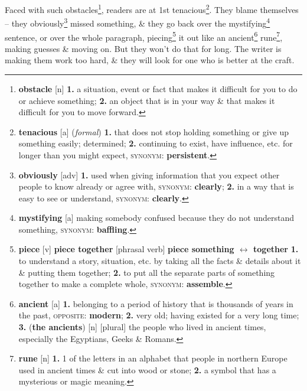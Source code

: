 \documentclass[oneside]{book}
\numberwithin{equation}{section}
\begin{document}
Faced with such obstacles\footnote{\textbf{obstacle} [n] \textbf{1.} a situation, event or fact that makes it difficult for you to do or achieve something; \textbf{2.} an object that is in your way \& that makes it difficult for you to move forward.}, readers are at 1st tenacious\footnote{\textbf{tenacious} [a] (\textit{formal}) \textbf{1.} that does not stop holding something or give up something easily; determined; \textbf{2.} continuing to exist, have influence, etc. for longer than you might expect, \textsc{synonym}: \textbf{persistent}.}. They blame themselves -- they obviously\footnote{\textbf{obviously} [adv] \textbf{1.} used when giving information that you expect other people to know already or agree with, \textsc{synonym}: \textbf{clearly}; \textbf{2.} in a way that is easy to see or understand, \textsc{synonym}: \textbf{clearly}.} missed something, \& they go back over the mystifying\footnote{\textbf{mystifying} [a] making somebody confused because they do not understand something, \textsc{synonym}: \textbf{baffling}.} sentence, or over the whole paragraph, piecing\footnote{\textbf{piece} [v] \textbf{piece together} [phrasal verb] \textbf{piece something $\leftrightarrow$ together} \textbf{1.} to understand a story, situation, etc. by taking all the facts \& details about it \& putting them together; \textbf{2.} to put all the separate parts of something together to make a complete whole, \textsc{synonym}: \textbf{assemble}.} it out like an ancient\footnote{\textbf{ancient} [a] \textbf{1.} belonging to a period of history that is thousands of years in the past, \textsc{opposite}: \textbf{modern}; \textbf{2.} very old; having existed for a very long time; \textbf{3.} (\textbf{the ancients}) [n] [plural] the people who lived in ancient times, especially the Egyptians, Geeks \& Romans.} rune\footnote{\textbf{rune} [n] \textbf{1.} 1 of the letters in an alphabet that people in northern Europe used in ancient times \& cut into wood or stone; \textbf{2.} a symbol that has a mysterious or magic meaning.}, making guesses \& moving on. But they won't do that for long. The writer is making them work too hard, \& they will look for one who is better at the craft.
\end{document}
